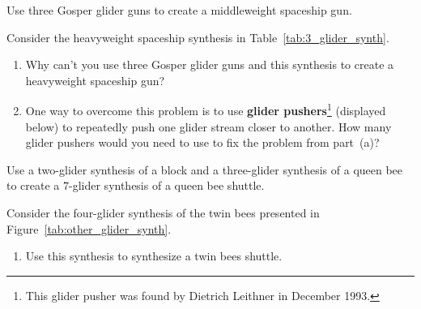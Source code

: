 \begin{multicols}{2}
	
	\mfilbreak
	
	
	\begin{problem}\label{exer:mwss_gun} 
		Use three Gosper glider guns to create a middleweight spaceship gun.
	\end{problem}
	
	
	\mfilbreak
	
	
	\begin{problem}\label{exer:hwss_gun} 
		Consider the heavyweight spaceship synthesis in Table~\ref{tab:3_glider_synth}.\smallskip
		
		\begin{enumerate}[label=\bf\color{ocre}(\alph*)]
			\item Why can't you use three Gosper glider guns and this synthesis to create a heavyweight spaceship gun?
			
			\item One way to overcome this problem is to use \textbf{glider pushers}\footnote{This glider pusher was found by Dietrich Leithner in December 1993.} (displayed below) to repeatedly push one glider stream closer to another. How many glider pushers would you need to use to fix the problem from part~(a)?\smallskip
			
			\begin{minipage}{\linewidth}
				\centering
			\end{minipage}
		\end{enumerate}
	\end{problem}
	
	
	\mfilbreak
	
	
	\begin{problem}\label{exer:queen_bee_synth} 
		Use a two-glider synthesis of a block and a three-glider synthesis of a queen bee to create a $7$-glider synthesis of a queen bee shuttle.
	\end{problem}
	
	
	\mfilbreak
	
	
	\begin{problem}\label{exer:twin_bee_shuttle_synth}
		Consider the four-glider synthesis of the twin bees presented in Figure~\ref{tab:other_glider_synth}.\smallskip
		
		\begin{enumerate}[label=\bf\color{ocre}(\alph*)]
			\item {} Use this synthesis to synthesize a twin bees shuttle.
			

\end{enumerate}
\end{problem}
\end{multicols}
